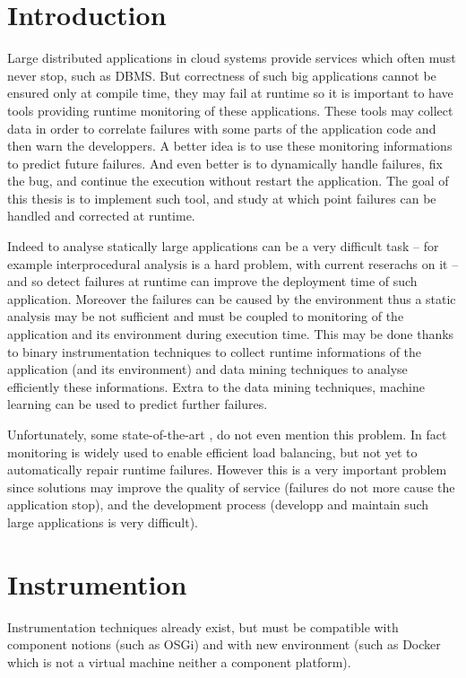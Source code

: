 \section{Introduction}

Large distributed applications in cloud systems provide services which often must never stop, such as DBMS. But correctness of such big applications cannot be ensured only at compile time, they may fail at runtime so it is important to have tools providing runtime monitoring of these applications. These tools may collect data in order to correlate failures with some parts of the application code and then warn the developpers. A better idea is to use these monitoring informations to predict future failures. And even better is to dynamically handle failures, fix the bug, and continue the execution without restart the application. The goal of this thesis is to implement such tool, and study at which point failures can be handled and corrected at runtime.

Indeed to analyse statically large applications can be a very difficult task -- for example interprocedural analysis is a hard problem, with current reserachs on it \cite{Art21} -- and so detect failures at runtime can improve the deployment time of such application. Moreover the failures can be caused by the environment thus a static analysis may be not sufficient and must be coupled to monitoring of the application and its environment during execution time. This may be done thanks to binary instrumentation techniques to collect runtime informations of the application (and its environment) and data mining techniques to analyse efficiently these informations. Extra to the data mining techniques, machine learning can be used to predict further failures. 

Unfortunately, some state-of-the-art \cite{Art4, Art7}, do not even mention this problem. In fact monitoring is widely used to enable efficient load balancing, but not yet to automatically repair runtime failures. However this is a very important problem since solutions may improve the quality of service (failures do not more cause the application stop), and the development process (developp and maintain such large applications is very difficult).

\section{Instrumention}

Instrumentation techniques \cite{Art5, Art10, Art16} already exist, but must be compatible with component notions (such as \textsf{OSGi}) and with new environment (such as \textsf{Docker} which is not a virtual machine neither a component platform).

